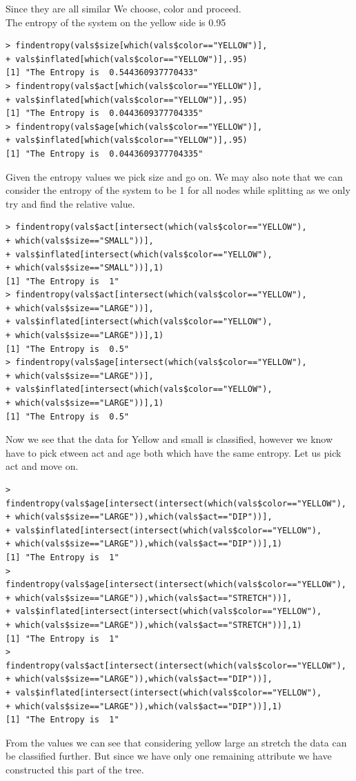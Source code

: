 \documentclass[fontsize=10pt]{scrartcl}
\begin{document}
\begin{enumerate}
		Since they are all similar We choose, color and proceed. \\
		The entropy of the system on the yellow side is 0.95 \\
\begin{verbatim}
> findentropy(vals$size[which(vals$color=="YELLOW")],
+ vals$inflated[which(vals$color=="YELLOW")],.95)
[1] "The Entropy is  0.544360937770433"
> findentropy(vals$act[which(vals$color=="YELLOW")],
+ vals$inflated[which(vals$color=="YELLOW")],.95)
[1] "The Entropy is  0.0443609377704335"
> findentropy(vals$age[which(vals$color=="YELLOW")],
+ vals$inflated[which(vals$color=="YELLOW")],.95)
[1] "The Entropy is  0.0443609377704335"
\end{verbatim}
		
		Given the entropy values we pick size and go on.
		We may also note that we can consider the entropy of the system to be 1 for all nodes while splitting as we only try and find the relative value.
\begin{verbatim}
> findentropy(vals$act[intersect(which(vals$color=="YELLOW"),
+ which(vals$size=="SMALL"))],
+ vals$inflated[intersect(which(vals$color=="YELLOW"),
+ which(vals$size=="SMALL"))],1)
[1] "The Entropy is  1"
> findentropy(vals$act[intersect(which(vals$color=="YELLOW"),
+ which(vals$size=="LARGE"))],
+ vals$inflated[intersect(which(vals$color=="YELLOW"),
+ which(vals$size=="LARGE"))],1)
[1] "The Entropy is  0.5"
> findentropy(vals$age[intersect(which(vals$color=="YELLOW"),
+ which(vals$size=="LARGE"))],
+ vals$inflated[intersect(which(vals$color=="YELLOW"),
+ which(vals$size=="LARGE"))],1)
[1] "The Entropy is  0.5"
\end{verbatim}
		Now we see that the data for Yellow and small is classified, however we know have to pick etween act and age both which have the same entropy. Let us pick act and move on.

\begin{verbatim}
> findentropy(vals$age[intersect(intersect(which(vals$color=="YELLOW"),
+ which(vals$size=="LARGE")),which(vals$act=="DIP"))],
+ vals$inflated[intersect(intersect(which(vals$color=="YELLOW"),
+ which(vals$size=="LARGE")),which(vals$act=="DIP"))],1)
[1] "The Entropy is  1"
> findentropy(vals$age[intersect(intersect(which(vals$color=="YELLOW"),
+ which(vals$size=="LARGE")),which(vals$act=="STRETCH"))],
+ vals$inflated[intersect(intersect(which(vals$color=="YELLOW"),
+ which(vals$size=="LARGE")),which(vals$act=="STRETCH"))],1)
[1] "The Entropy is  1"
> findentropy(vals$act[intersect(intersect(which(vals$color=="YELLOW"),
+ which(vals$size=="LARGE")),which(vals$act=="DIP"))],
+ vals$inflated[intersect(intersect(which(vals$color=="YELLOW"),
+ which(vals$size=="LARGE")),which(vals$act=="DIP"))],1)
[1] "The Entropy is  1"
\end{verbatim}
		From the values we can see that considering  yellow large an stretch the data can be classified further. But since we have only one remaining attribute  we have constructed this part of the tree.


\end{enumerate}
\end{document}
